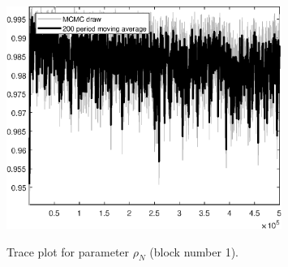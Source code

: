 \begin{figure}[H]
\centering
  \includegraphics[width=0.8\textwidth]{BRS_growth_ext_shopping/graphs/TracePlot_rho_N_blck_1}\\
    \caption{Trace plot for parameter ${\rho_N}$ (block number 1).}
\end{figure}
